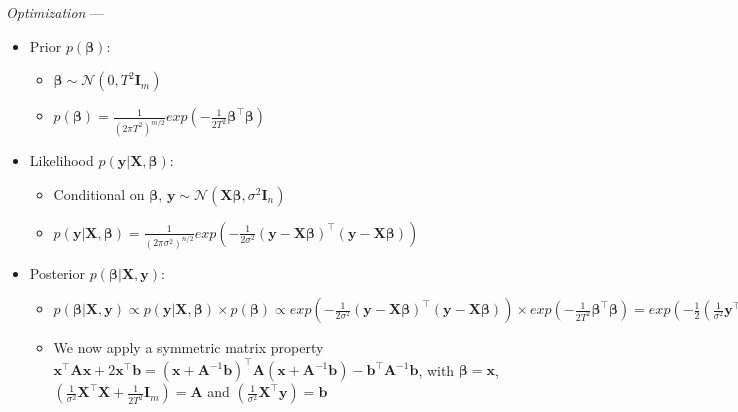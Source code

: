 \emph{Optimization} --- 
\begin{itemize}
    \item Prior $p( \boldsymbol{\beta} )$: 
    \begin{itemize}
        \item $\boldsymbol{\beta} \sim \mathcal{N}(0,  T^2 \boldsymbol{I}_m)$
        \item $p( \boldsymbol{\beta} ) = \frac{ 1 }{ (2\pi T^2)^{m/2}} exp ( -\frac{1}{2 T^2} \boldsymbol{\beta}^\intercal \boldsymbol{\beta} ) $
    \end{itemize}
    \item Likelihood $p( \boldsymbol{y} | \boldsymbol{X}, \boldsymbol{\beta} )$: 
    \begin{itemize}
        \item Conditional on $\boldsymbol{\beta}$, $\boldsymbol{y} \sim \mathcal{N}(\boldsymbol{X} \boldsymbol{\beta}, \sigma^2 \boldsymbol{I}_n)$
        \item $p( \boldsymbol{y} | \boldsymbol{X}, \boldsymbol{\beta} ) = \frac{ 1 }{ (2\pi\sigma^2)^{n/2}} exp ( -\frac{1}{2\sigma^2} (\boldsymbol{y} - \boldsymbol{X} \boldsymbol{\beta})^\intercal (\boldsymbol{y} - \boldsymbol{X} \boldsymbol{\beta}) ) $
    \end{itemize}
    \item Posterior $p( \boldsymbol{\beta} | \boldsymbol{X}, \boldsymbol{y} )$: 
    \begin{itemize}
        \item $p( \boldsymbol{\beta} | \boldsymbol{X}, \boldsymbol{y} ) \propto p ( \boldsymbol{y} |\boldsymbol{X}, \boldsymbol{\beta} ) \times p( \boldsymbol{\beta} ) \propto exp ( -\frac{1}{2\sigma^2} (\boldsymbol{y} - \boldsymbol{X} \boldsymbol{\beta})^\intercal (\boldsymbol{y} - \boldsymbol{X} \boldsymbol{\beta}) ) \times exp( -\frac{1}{2T^2} \boldsymbol{\beta}^\intercal \boldsymbol{\beta} ) = exp ( -\frac{1}{2} (\frac{1}{\sigma^2} \boldsymbol{y}^\intercal \boldsymbol{y} - 2 \boldsymbol{\beta}^\intercal \boldsymbol{X}^\intercal \boldsymbol{y} + \boldsymbol{\beta}^\intercal \boldsymbol{X}^\intercal \boldsymbol{X} \boldsymbol{\beta}) + \frac{1}{2T^2} \boldsymbol{\beta}^\intercal \boldsymbol{\beta}) \propto exp ( -\frac{1}{2} (\boldsymbol{\beta}^\intercal (\frac{1}{\sigma^2} \boldsymbol{X}^\intercal \boldsymbol{X} + \frac{1}{2T^2} \boldsymbol{I}_m) \boldsymbol{\beta} - \frac{2}{\sigma^2} \boldsymbol{\beta}^\intercal \boldsymbol{X}^\intercal \boldsymbol{y} )$
        \item We now apply a symmetric matrix property $\boldsymbol{x}^\intercal \boldsymbol{A} \boldsymbol{x} + 2 \boldsymbol{x}^\intercal \boldsymbol{b} = ( \boldsymbol{x} + \boldsymbol{A}^{-1} \boldsymbol{b} )^\intercal \boldsymbol{A} ( \boldsymbol{x} + \boldsymbol{A}^{-1} \boldsymbol{b} ) - \boldsymbol{b}^\intercal \boldsymbol{A}^{-1} \boldsymbol{b}$, with $\boldsymbol{\beta} = \boldsymbol{x}$, $(\frac{1}{\sigma^2} \boldsymbol{X}^\intercal \boldsymbol{X} + \frac{1}{2T^2} \boldsymbol{I}_m) = \boldsymbol{A}$ and $(\frac{1}{\sigma^2} \boldsymbol{X}^\intercal \boldsymbol{y}) = \boldsymbol{b}$

\end{itemize}
\end{itemize}
